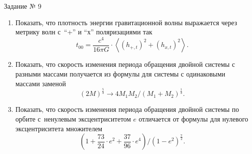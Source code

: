 \documentclass[12pt,pagesize,paper=192mm:108mm,landscape]{scrbook}
\begin{document}
\begin{titlepage}
  \vspace*{-0.5em}
  \begin{center}    




    \vfill
    \Large
    Задание № 9
 \smallskip

    \normalsize
    \begin{minipage}{0.9\linewidth}
      \begin{enumerate}
      \item Показать, что плотность энергии гравитационной волны
        выражается через метрику волн с~``+'' и ``х'' поляризациями так
        \[t_{00} = \frac{c^4}{16\pi G}\cdot \left<\left(h_{+,t}\right)^2+\left(h_{x,t}\right)^2\right>.\]
      \item Показать, что скорость изменения периода обращения двойной
        системы с разными массами получается из формулы для системы с
        одинаковыми массами заменой 
        \[(2M)^{\frac{5}{3}} \to 4M_1M_2/\left(M_1+M_2\right)^{\frac{1}{3}}.\]
      \item Показать, что скорость изменения периода обращения двойной
        системы по орбите с~ненулевым эксцентриситетом $e$ отличается от
        формулы для нулевого эксцентриситета множителем
        \[\left(1 + \frac{73}{24}\cdot e^2 + \frac{37}{96}\cdot e^4\right)\big/\left(1-e^2\right)^\frac{7}{2}.\]
      \end{enumerate}
    \end{minipage}
    \vfill

  \end{center}
\end{titlepage}
\end{document}
